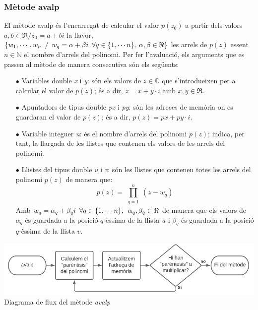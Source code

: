 \documentclass[12pt]{report}
\begin{document}
\subsubsection{Mètode avalp}
El mètode avalp és l'encarregat de calcular el valor $p(z_0)$ a partir dels valors $a,b\in\Re/z_0=a+bi$ la llavor, $\{w_1, \cdots, w_n \hspace{0.5em} / \hspace{0.5em} w_q=\alpha+\beta i \hspace{0.5em}\forall q\in\{1, \cdots n\}, \hspace{0.25em}\alpha,\beta\in\Re\}$ les arrels de $p(z)$ essent $n\in\mathbb{N}$ el nombre d'arrels del polinomi.
\newline
Per fer l'avaluació, els arguments que es passen al mètode de manera consecutiva són els següents:
\begin{itemize}
    \item [$\bullet$] Variables double \textit{x} i \textit{y}: són els valors de $z\in\mathbb{C}$ que s'introdueixen per a calcular el valor de $p(z)$; és a dir, $z=x+y\cdot i$ amb $x,y\in\Re$.
    \item [$\bullet$] Apuntadors de tipus double \textit{px} i \textit{py}: són les adreces de memòria on es guardaran el valor de $p(z)$; és a dir, $p(z)=px+py\cdot i$.
    \item [$\bullet$] Variable integuer \textit{n}: és el nombre d'arrels del polinomi $p(z)$; indica, per tant, la llargada de les llistes que contenen els valors de les arrels del polinomi.
    \item [$\bullet$] Llistes del tipus double \textit{u} i \textit{v}: són les llistes que contenen totes les arrels del polinomi $p(z)$ de manera que:
    \begin{equation*}
        p(z)=\prod_{\substack{q=1}}^n(z-w_q)
    \end{equation*}
    Amb $w_q=\alpha_q+\beta_q i \hspace{0.5em}\forall q\in\{1, \cdots n\}, \hspace{0.5em}\alpha_q,\beta_q\in\Re$ de manera que els valors de $\alpha_q$ és guardada a la posició $q$-èssima de la llista $\textit{u}$ i $\beta_q$ és guardada a la posició $q$-èssima de la llista $v$.
\end{itemize}

\begin{center}
    \includegraphics[width=1\textwidth]{UML_avalp.PNG}
    \newline
Diagrama de flux del mètode \textit{avalp}
\label{fig:UML_avalp}
\end{center}
\end{document}
